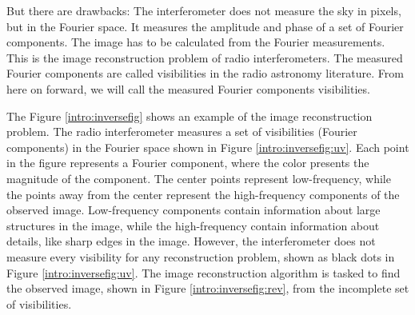 But there are drawbacks: The interferometer does not measure the sky in pixels, but in the Fourier space. It measures the amplitude and phase of a set of Fourier components. The image has to be calculated from the Fourier measurements. This is the image reconstruction problem of radio interferometers. The measured Fourier components are called visibilities in the radio astronomy literature. From here on forward, we will call the measured Fourier components visibilities.

The Figure \ref{intro:inversefig} shows an example of the image reconstruction problem. The radio interferometer measures a set of visibilities (Fourier components) in the Fourier space shown in Figure \ref{intro:inversefig:uv}. Each point in the figure represents a Fourier component, where the color presents the magnitude of the component. The center points represent low-frequency, while the points away from the center represent the high-frequency components of the observed image. Low-frequency components contain information about large structures in the image, while the high-frequency contain information about details, like sharp edges in the image. However, the interferometer does not measure every visibility for any reconstruction problem, shown as black dots in Figure \ref{intro:inversefig:uv}. The image reconstruction algorithm is tasked to find the observed image, shown in Figure \ref{intro:inversefig:rev}, from the incomplete set of visibilities. 

